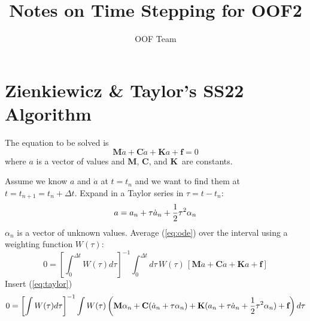 \documentclass[onecolumn,prl,floatfix,12pt]{revtex4}
\newcommand{\M}{\textbf{M}}
\newcommand{\C}{\textbf{C}}
\newcommand{\K}{\textbf{K}}
\newcommand{\f}{\textbf{f}}
\newcommand{\half}{{1\over2}}
\begin{document}
\title{Notes on Time Stepping for OOF2}

\author{OOF Team}

\maketitle

\section{Zienkiewicz \& Taylor's SS22 Algorithm}

The equation to be solved is
\begin{equation}
  \label{eq:ode}
  \M \ddot a + \C \dot a + \K a + \f = 0
\end{equation}
where $a$ is a vector of values and \M, \C, and \K\ are constants.

Assume we know $a$ and $\dot a$ at $t=t_n$ and we want to find them at
$t=t_{n+1} = t_n + \Delta t$.  Expand in a Taylor series in $\tau =
t-t_n$:
\begin{equation}
  \label{eq:taylor}
  a = a_n + \tau\dot a_n + \half\tau^2\alpha_n
\end{equation}
$\alpha_n$ is a vector of unknown values.
Average (\ref{eq:ode}) over the interval using a weighting function $W(\tau)$:
\begin{equation}
  \label{eq:weighted}
  0=\left[\int_0^{\Delta t} W(\tau)d\tau\right]^{-1}
  \int_0^{\Delta t}d\tau\,W(\tau)\,
  \left[\M \ddot a + \C \dot a + \K a + \f\right]
\end{equation}
Insert (\ref{eq:taylor})
\begin{equation}
  \label{eq:w1}
0 = \left[\int W(\tau)d\tau\right]^{-1}\int W(\tau)\left(\M \alpha_n + \C
  (\dot a_n + \tau \alpha_n) + \K(a_n + \tau\dot a_n + \half
  \tau^2\alpha_n)+ \f
 \right) d\tau
\end{equation}
\end{document}
